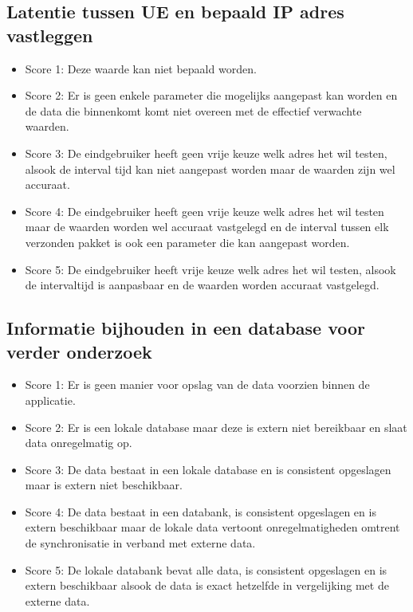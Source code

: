 \subsection{Latentie tussen UE en bepaald IP adres vastleggen}

\begin{itemize}
    \item Score 1: Deze waarde kan niet bepaald worden.
    \item Score 2: Er is geen enkele parameter die mogelijks aangepast kan worden en de data die binnenkomt komt niet overeen met de effectief verwachte waarden.
    \item Score 3: De eindgebruiker heeft geen vrije keuze welk adres het wil testen, alsook de interval tijd kan niet aangepast worden maar de waarden zijn wel accuraat.
    \item Score 4: De eindgebruiker heeft geen vrije keuze welk adres het wil testen maar de waarden worden wel accuraat vastgelegd en de interval tussen elk verzonden pakket is ook een parameter die kan aangepast worden.
    \item Score 5: De eindgebruiker heeft vrije keuze welk adres het wil testen, alsook de intervaltijd is aanpasbaar en de waarden worden accuraat vastgelegd.
\end{itemize}

\subsection{Informatie bijhouden in een database voor verder onderzoek}

\begin{itemize}
    \item Score 1: Er is geen manier voor opslag van de data voorzien binnen de applicatie.
    \item Score 2: Er is een lokale database maar deze is extern niet bereikbaar en slaat data onregelmatig op.
    \item Score 3: De data bestaat in een lokale database en is consistent opgeslagen maar is extern niet beschikbaar.
    \item Score 4: De data bestaat in een databank, is consistent opgeslagen en is extern beschikbaar maar de lokale data vertoont onregelmatigheden omtrent de synchronisatie in verband met externe data.
    \item Score 5: De lokale databank bevat alle data, is consistent opgeslagen en is extern beschikbaar alsook de data is exact hetzelfde in vergelijking met de externe data. 
\end{itemize}

